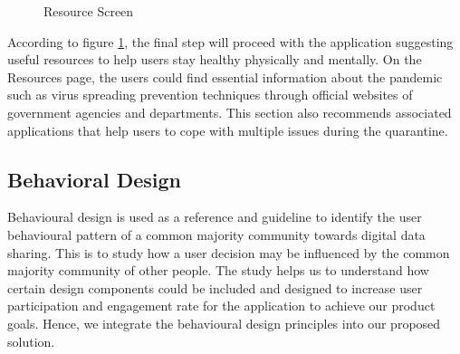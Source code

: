 \begin{enumerate}[a)]
\begin{figure}[H]
            \caption{Resource Screen}
            \label{fig:iter3-proto-7}
          \end{figure}
          \par According to figure \ref{fig:iter3-proto-7}, the final step will proceed with the application suggesting useful resources to help users stay healthy physically and mentally. On the Resources page, the users could find essential information about the pandemic such as virus spreading prevention techniques through official websites of government agencies and departments. This section also recommends associated applications that help users to cope with multiple issues during the quarantine.
      \end{enumerate}

  \subsection{Behavioral Design}
    \par Behavioural design is used as a reference and guideline to identify the user behavioural pattern of a
    common majority community towards digital data sharing. This is to study how a user decision may
    be influenced by the common majority community of other people. The study helps us to understand
    how certain design components could be included and designed to increase user participation and
    engagement rate for the application to achieve our product goals. Hence, we integrate the behavioural
    design principles into our proposed solution.

